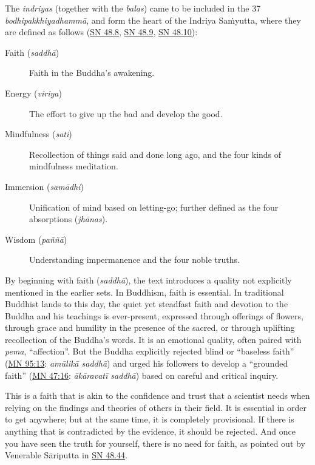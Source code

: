 \documentclass[12pt,openany]{book}%
\begin{document}
The \textit{indriyas} (together with the \textit{balas}) came to be included in the 37 \textit{\textsanskrit{bodhipakkhiyadhammā}}, and form the heart of the Indriya \textsanskrit{Saṁyutta}, where they are defined as follows (\href{https://suttacentral.net/sn48.8}{SN 48.8}, \href{https://suttacentral.net/sn48.9}{SN 48.9}, \href{https://suttacentral.net/sn48.10}{SN 48.10}):

\begin{description}%
\item[Faith (\textit{\textsanskrit{saddhā}})] Faith in the Buddha’s awakening.%
\item[Energy (\textit{viriya})] The effort to give up the bad and develop the good.%
\item[Mindfulness (\textit{sati})] Recollection of things said and done long ago, and the four kinds of mindfulness meditation.%
\item[Immersion (\textit{\textsanskrit{samādhi}})] Unification of mind based on letting-go; further defined as the four absorptions (\textit{\textsanskrit{jhānas}}).%
\item[Wisdom (\textit{\textsanskrit{paññā}})] Understanding impermanence and the four noble truths.%
\end{description}

By beginning with faith (\textit{\textsanskrit{saddhā}}), the text introduces a quality not explicitly mentioned in the earlier sets. In Buddhism, faith is essential. In traditional Buddhist lands to this day, the quiet yet steadfast faith and devotion to the Buddha and his teachings is ever-present, expressed through offerings of flowers, through grace and humility in the presence of the sacred, or through uplifting recollection of the Buddha’s words. It is an emotional quality, often paired with \textit{pema}, “affection”. But the Buddha explicitly rejected blind or “baseless faith” (\href{https://suttacentral.net/mn95\#13}{MN 95:13}: \textit{\textsanskrit{amūlikā} \textsanskrit{saddhā}}) and urged his followers to develop a “grounded faith” (\href{https://suttacentral.net/mn47\#16}{MN 47:16}: \textit{\textsanskrit{ākāravatī} \textsanskrit{saddhā}}) based on careful and critical inquiry.

This is a faith that is akin to the confidence and trust that a scientist needs when relying on the findings and theories of others in their field. It is essential in order to get anywhere; but at the same time, it is completely provisional. If there is anything that is contradicted by the evidence, it should be rejected. And once you have seen the truth for yourself, there is no need for faith, as pointed out by Venerable \textsanskrit{Sāriputta} in \href{https://suttacentral.net/sn48.44}{SN 48.44}.
\end{document}
